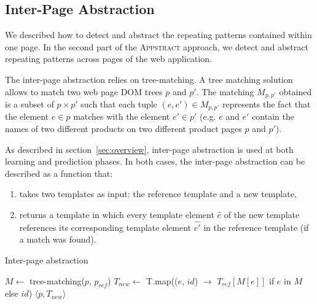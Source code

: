 

\subsection{Inter-Page Abstraction}\label{sec:inter}
We described how to detect and abstract the repeating patterns contained within one page. 
In the second part of the \textsc{Appstract} approach, we detect and abstract repeating patterns across pages of the web application.

The inter-page abstraction relies on tree-matching.
A tree matching solution allows to match two web page DOM trees $p$ and $p'$. 
The matching $M_{p, p'}$ obtained is a subset of  $p \times p'$ such that each tuple $(e, e') \in M_{p, p'}$ represents the fact that the element $e \in p$ matches with the element $e' \in p'$ (e.g. $e$ and $e'$ contain the names of two different products on two different product pages $p$ and $p'$).

As described in section~\ref{sec:overview}, inter-page abstraction is used at both learning and prediction phases. In both cases, the inter-page abstraction can be described as a function that:
\begin{enumerate}
    \item takes two templates as input: the reference template and a new template,
    \item returns a template in which every template element $\hat{e}$ of the new template references its corresponding template element $\hat{e'}$ in the reference template (if a match was found).
\end{enumerate}

\begin{algorithm}
    \caption{Inter-page abstraction}\label{alg:inter-page}
    \begin{algorithmic}[1]
          \State $M \gets$ tree-matching($p$, $p_{ref}$)
          \State $T_{new} \gets$ T.map(($e$, $id$) $\to$ $T_{ref}[M[e]]$ if $e$ in $M$ else $id$)
          \State \Return $\langle p, T_{new} \rangle$
      \EndFunction
    \end{algorithmic}
\end{algorithm}

